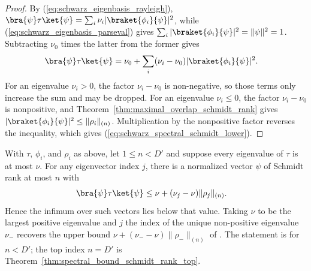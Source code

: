 \begin{proof}
    \leanok
    By (\ref{eq:schwarz_eigenbasis_rayleigh}),
    $\bra{\psi}\tau\ket{\psi}
        =\sum_i\nu_i|\braket{\phi_i}{\psi}|^2$, while
    (\ref{eq:schwarz_eigenbasis_parseval}) gives
    $\sum_i|\braket{\phi_i}{\psi}|^2=\|\psi\|^2=1$. Subtracting $\nu_0$
    times the latter from the former gives
    \begin{align}
        \bra{\psi}\tau\ket{\psi}
         & =\nu_0+\sum_i(\nu_i-\nu_0)
        |\braket{\phi_i}{\psi}|^2.
        \label{eq:schwarz_spectral_lower_expansion}
    \end{align}
    For an eigenvalue $\nu_i>0$, the factor $\nu_i-\nu_0$ is non-negative, so
    those terms only increase the sum and may be dropped. For an eigenvalue
    $\nu_i\le0$, the factor $\nu_i-\nu_0$ is nonpositive, and
    Theorem~\ref{thm:maximal_overlap_schmidt_rank} gives
    $|\braket{\phi_i}{\psi}|^2\le\|\rho_i\|_{(n)}$. Multiplication by the
    nonpositive factor reverses the inequality, which gives
    (\ref{eq:schwarz_spectral_schmidt_lower}).
\end{proof}

\begin{theorem}
    \label{thm:spectral_upper_bound_schmidt_rank}
    \leanok
    With $\tau$, $\phi_i$, and $\rho_i$ as above, let $1\le n<D'$ and suppose
    every eigenvalue of $\tau$ is at most $\nu$. For any eigenvector index $j$,
    there is a normalized vector $\psi$ of Schmidt rank at most $n$ with
    \begin{align}
        \bra{\psi}\tau\ket{\psi}
         & \le\nu+(\nu_j-\nu)\|\rho_j\|_{(n)}.
        \label{eq:schwarz_spectral_schmidt_upper}
    \end{align}
    Hence the infimum over such vectors lies below that value. Taking $\nu$
    to be the largest positive eigenvalue and $j$ the index of the unique
    non-positive eigenvalue $\nu_-$ recovers the upper bound
    $\nu+(\nu_--\nu)\|\rho_-\|_{(n)}$ of
    \cite[Chapter~3, Proposition~3.2]{Wolf2012Quantum}. The statement is for
    $n<D'$; the top index $n=D'$ is
    Theorem~\ref{thm:spectral_bound_schmidt_rank_top}.
\end{theorem}


